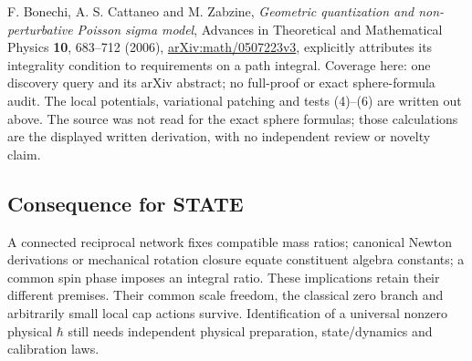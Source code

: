 \documentclass[11pt,a4paper]{article}
\begin{document}
F. Bonechi, A. S. Cattaneo and M. Zabzine, \emph{Geometric quantization
and non-perturbative Poisson sigma model}, Advances in Theoretical and
Mathematical Physics \textbf{10}, 683--712 (2006),
\href{https://arxiv.org/abs/math/0507223v3}{arXiv:math/0507223v3},
explicitly attributes its integrality condition to requirements on a
path integral. Coverage here: one discovery query and its arXiv
abstract; no full-proof or exact sphere-formula audit. The local
potentials, variational patching and tests (4)--(6) are written out
above. The source was not read for the exact sphere formulas; those
calculations are the displayed written derivation, with no independent
review or novelty claim.

\hypertarget{consequence-for-state}{%
\subsection{Consequence for STATE}\label{consequence-for-state}}

A connected reciprocal network fixes compatible mass ratios; canonical
Newton derivations or mechanical rotation closure equate constituent
algebra constants; a common spin phase imposes an integral ratio. These
implications retain their different premises. Their common scale
freedom, the classical zero branch and arbitrarily small local cap
actions survive. Identification of a universal nonzero physical
\(\hbar\) still needs independent physical preparation, state/dynamics
and calibration laws.
\end{document}

